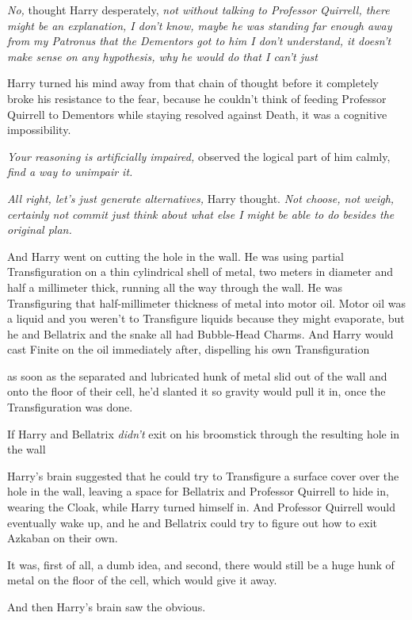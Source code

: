 \emph{No,} thought Harry desperately, \emph{not without talking to Professor
Quirrell, there might be an explanation, I don't know, maybe he was standing
far enough away from my Patronus that the Dementors got to him{\el} I don't
understand, it doesn't make sense on any hypothesis, why he would do
that{\el} I can't just{\el}}

Harry turned his mind away from that chain of thought before it completely
broke his resistance to the fear, because he couldn't think of feeding
Professor Quirrell to Dementors while staying resolved against Death, it was a
cognitive impossibility.

\emph{Your reasoning is artificially impaired,} observed the logical part of
him calmly, \emph{find a way to unimpair it.}

\emph{All right, let's just generate alternatives,} Harry thought. \emph{Not
choose, not weigh, certainly not commit{\el} just think about what else I
might be able to do besides the original plan.}

And Harry went on cutting the hole in the wall. He was using partial
Transfiguration on a thin cylindrical shell of metal, two meters in diameter
and half a millimeter thick, running all the way through the wall. He was
Transfiguring that half-millimeter thickness of metal into motor oil. Motor oil
was a liquid and you weren't to Transfigure liquids because they might
evaporate, but he and Bellatrix and the snake all had Bubble-Head Charms. And
Harry would cast Finite on the oil immediately after, dispelling his own
Transfiguration{\el}

{\el} as soon as the separated and lubricated hunk of metal slid out of the
wall and onto the floor of their cell, he'd slanted it so gravity would pull it
in, once the Transfiguration was done.

If Harry and Bellatrix \emph{didn't} exit on his broomstick through the
resulting hole in the wall{\el}

Harry's brain suggested that he could try to Transfigure a surface cover over
the hole in the wall, leaving a space for Bellatrix and Professor Quirrell to
hide in, wearing the Cloak, while Harry turned himself in. And Professor
Quirrell would eventually wake up, and he and Bellatrix could try to figure out
how to exit Azkaban on their own.

It was, first of all, a dumb idea, and second, there would still be a huge hunk
of metal on the floor of the cell, which would give it away.

And then Harry's brain saw the obvious.

